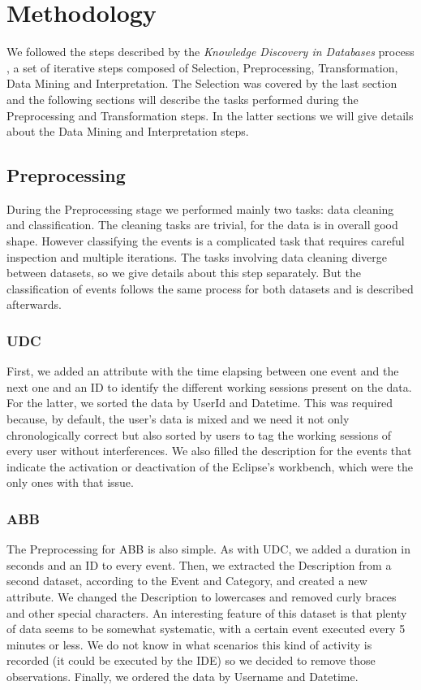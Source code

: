 \documentclass[conference]{IEEEtran}
\begin{document}
\section{Methodology}
We followed the steps described by the \emph{Knowledge Discovery in Databases} process \cite{FPG96}, a set of iterative steps composed of Selection, Preprocessing, Transformation, Data Mining and Interpretation. The Selection was covered by the last section and the following sections will describe the tasks performed during the Preprocessing and Transformation steps. In the latter sections we will give details about the Data Mining and Interpretation steps.

\subsection{Preprocessing}
During the Preprocessing stage we performed mainly two tasks: data cleaning and classification. The cleaning tasks are trivial, for the data is in overall good shape. However classifying the events is a complicated task that requires careful inspection and multiple iterations. The tasks involving data cleaning diverge between datasets, so we give details about this step separately. But the classification of events follows the same process for both datasets and is described afterwards.

\subsubsection{UDC}
First, we added an attribute with the time elapsing between one event and the next one and an ID to identify the different working sessions present on the data. For the latter, we sorted the data by UserId and Datetime. This was required because, by default, the user's data is mixed and we need it not only chronologically correct but also sorted by users to tag the working sessions of every user without interferences. We also filled the description for the events that indicate the activation or deactivation of the Eclipse's workbench, which were the only ones with that issue.

\subsubsection{ABB}
The Preprocessing for ABB is also simple. As with UDC, we added a duration in seconds and an ID to every event. Then, we extracted the Description from a second dataset, according to the Event and Category, and created a new attribute. We changed the Description to lowercases and removed curly braces and other special characters. 
An interesting feature of this dataset is that plenty of data seems to be somewhat systematic, with a certain event executed every 5 minutes or less. We do not know in what scenarios this kind of activity is recorded (it could be executed by the IDE) so we decided to remove those observations. Finally, we ordered the data by Username and Datetime.
\end{document}
